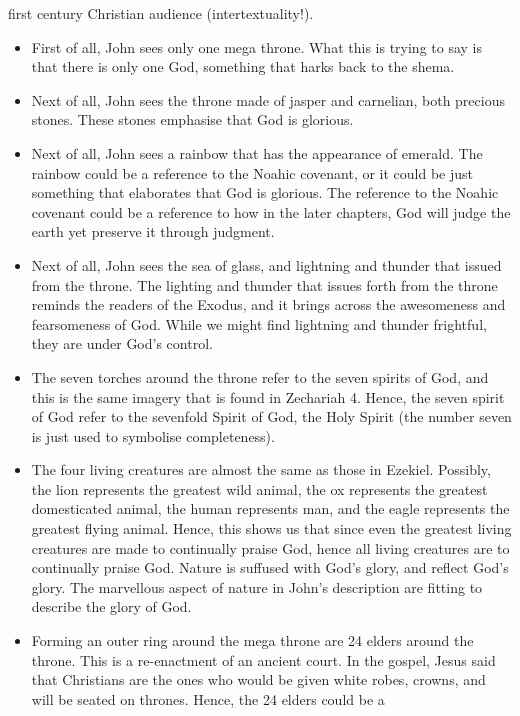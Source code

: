 \begin{itemize}
{  first century Christian audience (intertextuality!).
  \begin{itemize}
    \item{First of all, John sees only one mega throne.  What this is trying
    to say is that there is only one God, something that harks back to the
    shema.}
    \item{Next of all, John sees the throne made of jasper and carnelian, both precious stones. These stones emphasise that God is glorious.}
    \item{Next of all, John sees a rainbow that has the appearance of
    emerald.  The rainbow could be a reference to the Noahic covenant, or it
    could be just something that elaborates that God is glorious.  The
    reference to the Noahic covenant could be a reference to how in the later
    chapters, God will judge the earth yet preserve it through judgment.}
    \item{Next of all, John sees the sea of glass, and lightning and thunder
    that issued from the throne.  The lighting and thunder that issues forth
    from the throne reminds the readers of the Exodus, and it brings across
    the awesomeness and fearsomeness of God.  While we might find lightning
    and thunder frightful, they are under God's control.}
    \item{The seven torches around the throne refer to the seven spirits of
    God, and this is the same imagery that is found in Zechariah 4.  Hence,
    the seven spirit of God refer to the sevenfold Spirit of God, the Holy
    Spirit (the number seven is just used to symbolise completeness).  }
    \item{The four living creatures are almost the same as those in Ezekiel.
    Possibly, the lion represents the greatest wild animal, the ox represents
    the greatest domesticated animal, the human represents man, and the eagle
    represents the greatest flying animal.  Hence, this shows us that since
    even the greatest living creatures are made to continually praise God,
    hence all living creatures are to continually praise God. Nature is suffused with God's glory, and reflect God's glory. The marvellous aspect of nature in John's description are fitting to describe the glory of God. }
    \item{Forming an outer ring around the mega throne are 24 elders around
    the throne.  This is a re-enactment of an ancient court.  In the gospel,
    Jesus said that Christians are the ones who would be given white robes,
    crowns, and will be seated on thrones.  Hence, the 24 elders could be a
}
\end{itemize}}
\end{itemize}
